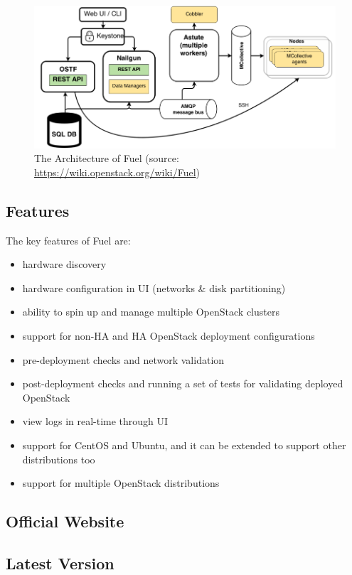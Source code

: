 \documentclass[a4paper, 12pt]{article}
\begin{document}
\begin{figure}[H]
	\centering
	\includegraphics[width=\linewidth]{img/fuel_arch.png}
  	\caption{The Architecture of Fuel (source: \href{https://wiki.openstack.org/wiki/Fuel}{https://wiki.openstack.org/wiki/Fuel})}
	\label{fig:4-waycache}
\end{figure}


\subsection{Features}
The key features of Fuel are:
\begin{itemize}
\item
hardware discovery
\item
hardware configuration in UI (networks \& disk partitioning)
\item
ability to spin up and manage multiple OpenStack clusters
\item
support for non-HA and HA OpenStack deployment configurations
\item
pre-deployment checks and network validation
\item
post-deployment checks and running a set of tests for validating deployed OpenStack
\item
view logs in real-time through UI
\item
support for CentOS and Ubuntu, and it can be extended to support other distributions too
\item
support for multiple OpenStack distributions
\end{itemize}

\subsection{Official Website}
\subsection{Latest Version}
\end{document}
